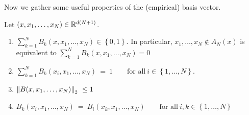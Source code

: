 %
Now we gather some useful properties of the (empirical) basis vector.
\begin{lemma}
  \label{lem:basis_sum}
  Let $(x,x_1,\ldots,x_N)\in\mathbb{R}^{d(N+1)}$.
  \begin{enumerate}[label=(\roman*)]
    \item
      $
      \sum_{k=1}^{N} 
      B_k(x,x_1,\ldots,x_N)
      \in
      \left\{ 0,1 \right\}
      $. 
      In particular,
      $
        x_1,\ldots,x_N\notin A_N(x)
      $
      is equivalent to
      $
      \sum_{k=1}^{N} 
      B_k(x,x_1,\ldots,x_N)
      =0
      $
    \item
      $
      \sum_{k=1}^{N} 
      B_k(x_i,x_1,\ldots,x_N)
      \ 
      =
      \ 
      1
      \qquad
      \text{for all}\ 
      i\in \left\{ 1,\ldots,N \right\}
      $.
      \item
        $
        \norm
        {
      B(x,x_1,\ldots,x_N)
        }_2
        \ 
        \le 1
        \ 
        $
      \item
        $
        B_k(x_i,x_1,\ldots,x_N)
        \ 
        =
        \ 
        B_i(x_k,x_1,\ldots,x_N)
        \qquad
        \text{for all}\ 
        i,k\in \left\{ 1,\ldots,N \right\}
        $
  \end{enumerate}
\end{lemma}
